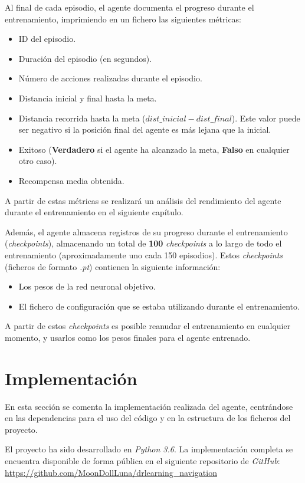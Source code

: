 Al final de cada episodio, el agente documenta el progreso durante el entrenamiento, imprimiendo en un fichero las siguientes métricas:
\begin{itemize}
	\item ID del episodio.
	\item Duración del episodio (en segundos).
	\item Número de acciones realizadas durante el episodio.
	\item Distancia inicial y final hasta la meta.
	\item Distancia recorrida hasta la meta ($dist\_inicial - dist\_final$). Este valor puede ser negativo si la posición final del agente es más lejana que la inicial.
	\item Exitoso (\textbf{Verdadero} si el agente ha alcanzado la meta, \textbf{Falso} en cualquier otro caso).
	\item Recompensa media obtenida.
\end{itemize}

A partir de estas métricas se realizará un análisis del rendimiento del agente durante el entrenamiento en el siguiente capítulo.

Además, el agente almacena registros de su progreso durante el entrenamiento (\textit{checkpoints}), almacenando un total de \textbf{100} \textit{checkpoints} a lo largo de todo el entrenamiento (aproximadamente uno cada 150 episodios). Estos \textit{checkpoints} (ficheros de formato \textit{.pt}) contienen la siguiente información:
\begin{itemize}
	\item Los pesos de la red neuronal objetivo.
	\item El fichero de configuración que se estaba utilizando durante el entrenamiento.
\end{itemize}

A partir de estos \textit{checkpoints} es posible reanudar el entrenamiento en cualquier momento, y usarlos como los pesos finales para el agente entrenado.

\section{Implementación}

En esta sección se comenta la implementación realizada del agente, centrándose en las dependencias para el uso del código y en la estructura de los ficheros del proyecto.

El proyecto ha sido desarrollado en \textit{Python 3.6}. La implementación completa se encuentra disponible de forma pública en el siguiente repositorio de \textit{GitHub}: \url{https://github.com/MoonDollLuna/drlearning_navigation}

